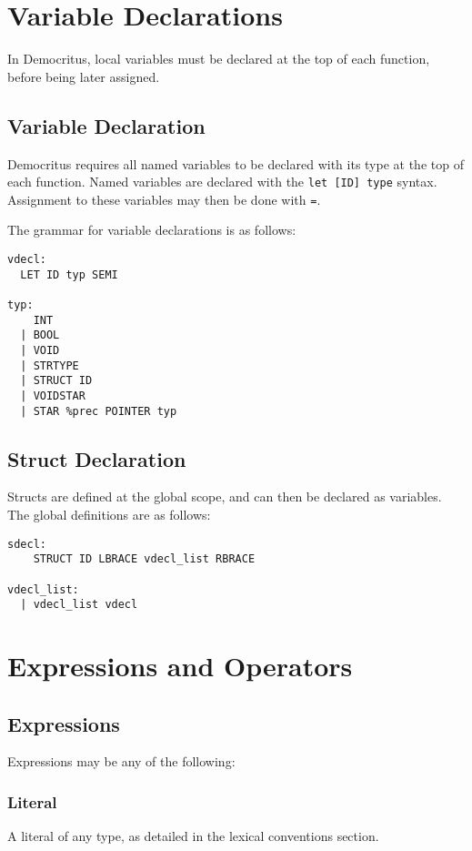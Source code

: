 \section{Variable Declarations}

  \medskip \noindent
  In Democritus, local variables must be declared at the top of each function, before being later assigned. 

      \subsection{Variable Declaration}
        Democritus requires all named variables to be declared with its type at the top of each function. Named variables are declared with the \texttt{let [ID] type} syntax. Assignment to these variables may then be done with \texttt{=}.
        
        \bigskip \noindent 
        The grammar for variable declarations is as follows: 
        \begin{verbatim}
vdecl:
  LET ID typ SEMI 

typ:
    INT       
  | BOOL      
  | VOID      
  | STRTYPE   
  | STRUCT ID 
  | VOIDSTAR  
  | STAR %prec POINTER typ 
        \end{verbatim}

    \subsection{Struct Declaration}
      Structs are defined at the global scope, and can then be declared as variables. The global definitions are as follows: 

      \begin{verbatim}
sdecl:
    STRUCT ID LBRACE vdecl_list RBRACE

vdecl_list:
  | vdecl_list vdecl
      \end{verbatim}

\section{Expressions and Operators}


	\subsection{Expressions}
    Expressions may be any of the following:
    
    \subsubsection{Literal}
      A literal of any type, as detailed in the lexical conventions section.
